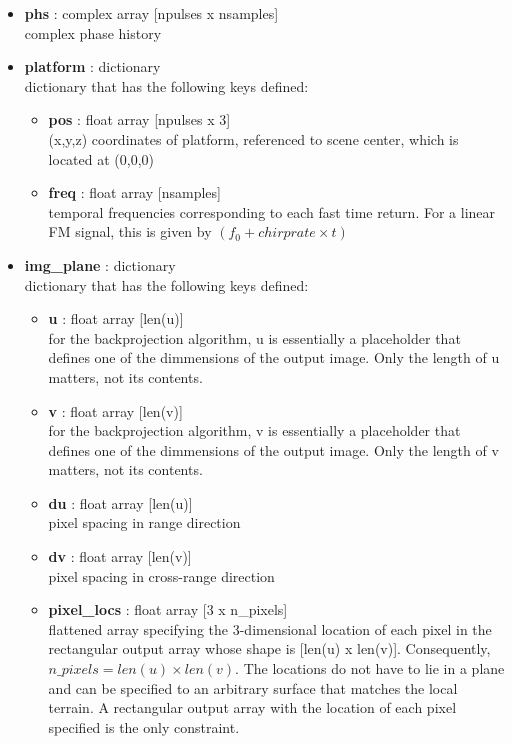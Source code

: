 \documentclass{article}
\newcommand{\defs}[2]{\textbf{{#1}} : {#2}}
\begin{document}
\begin{itemize}
	\item \defs{phs}{complex array [npulses x nsamples]}\\
  	complex phase history
  	\item \defs{platform}{dictionary}\\
  	dictionary that has the following keys defined:
	\begin{itemize}
	    \item \defs{pos}{float array [npulses x 3]}\\
	       	(x,y,z) coordinates of platform, referenced to scene center, which is located at (0,0,0)
		\item\defs{freq}{float array [nsamples]}\\
	    	temporal frequencies corresponding to each fast time return.  For a linear FM signal, this is given by $(f_0+chirprate\times t)$
	\end{itemize}
  	\item \defs{img\_plane}{dictionary}\\
  	dictionary that has the following keys defined:
	\begin{itemize}
	    \item \defs{u}{float array [len(u)]}\\
	    	for the backprojection algorithm, u is essentially a placeholder that defines one of the dimmensions of the output image.  Only the length of u matters, not its contents.
	    \item \defs{v}{float array [len(v)]}\\
	    	for the backprojection algorithm, v is essentially a placeholder that defines one of the dimmensions of the output image.  Only the length of v matters, not its contents.
		\item \defs{du}{float array [len(u)]}\\
	    	pixel spacing in range direction
		\item \defs{dv}{float array [len(v)]}\\
	    	pixel spacing in cross-range direction
	    \item \defs{pixel\_locs}{float array [3 x n\_pixels]}\\
	    	flattened array specifying the 3-dimensional location of each pixel in the rectangular output array whose shape is [len(u) x len(v)].  Consequently, $n\_pixels = len(u) \times len(v)$.  The locations do not have to lie in a plane and can be specified to an arbitrary surface that matches the local terrain.  A rectangular output array with the location of each pixel specified is the only constraint.

\end{itemize}
\end{itemize}
\end{document}
